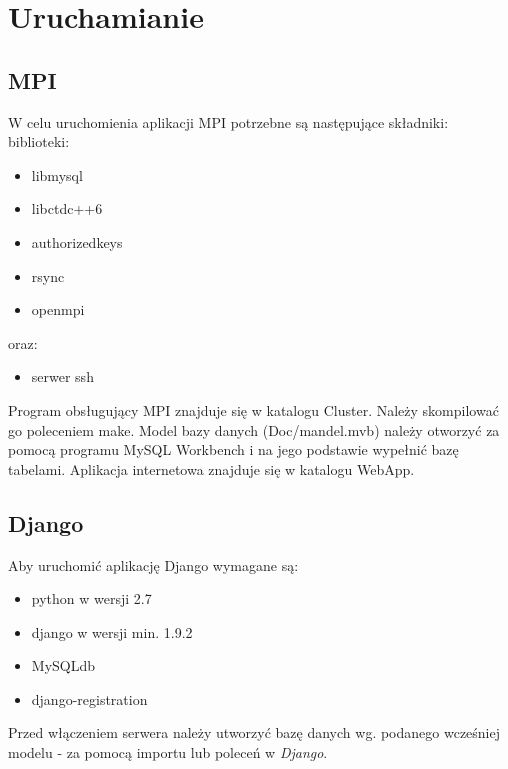 \documentclass[a4paper]{article}
\begin{document}
\newpage

\section{Uruchamianie}
\subsection{MPI}
W celu uruchomienia aplikacji MPI potrzebne są następujące składniki:
biblioteki:
\begin{itemize}
\item libmysql
\item libctdc++6
\item authorizedkeys
\item rsync
\item openmpi
\end{itemize}
oraz:
\begin{itemize}
\item serwer ssh
\end{itemize}

Program obsługujący MPI znajduje się w katalogu Cluster. Należy skompilować go poleceniem make. Model bazy danych (Doc/mandel.mvb) należy otworzyć za pomocą programu MySQL Workbench i na jego podstawie wypełnić bazę tabelami. Aplikacja internetowa znajduje się w katalogu WebApp.

\subsection{Django}
Aby uruchomić aplikację Django wymagane są:
\begin{itemize}
\item python w wersji 2.7
\item django w wersji min. 1.9.2
\item MySQLdb
\item django-registration
\end{itemize}
Przed włączeniem serwera należy utworzyć bazę danych wg. podanego wcześniej modelu - za pomocą importu lub poleceń w \textit{Django}.\\
\end{document}

